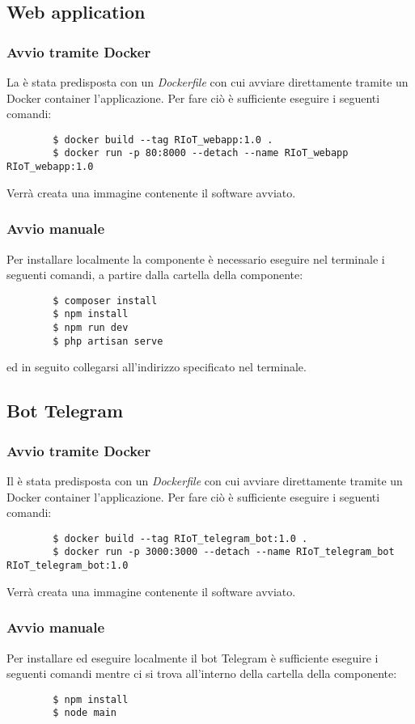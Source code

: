 	\subsection{Web application}

		\subsubsection{Avvio tramite Docker}
		La  è stata predisposta con un \textit{Dockerfile} con cui avviare direttamente tramite un Docker container l'applicazione. Per fare ciò è sufficiente eseguire i seguenti comandi:
		\begin{verbatim}
		$ docker build --tag RIoT_webapp:1.0 .
		$ docker run -p 80:8000 --detach --name RIoT_webapp RIoT_webapp:1.0
		\end{verbatim}
		Verrà creata una immagine contenente il software avviato.

		\subsubsection{Avvio manuale}
		Per installare localmente la componente  è necessario eseguire nel terminale i seguenti comandi, a partire dalla cartella della componente:
		\begin{verbatim}
		$ composer install
		$ npm install
		$ npm run dev
		$ php artisan serve
		\end{verbatim}
		ed in seguito collegarsi all'indirizzo specificato nel terminale.

	\subsection{Bot Telegram}

		\subsubsection{Avvio tramite Docker}
		Il  è stata predisposta con un \textit{Dockerfile} con cui avviare direttamente tramite un Docker container l'applicazione. Per fare ciò è sufficiente eseguire i seguenti comandi:
		\begin{verbatim}
		$ docker build --tag RIoT_telegram_bot:1.0 .
		$ docker run -p 3000:3000 --detach --name RIoT_telegram_bot RIoT_telegram_bot:1.0
		\end{verbatim}
		Verrà creata una immagine contenente il software avviato.

		\subsubsection{Avvio manuale}
		Per installare ed eseguire localmente il bot Telegram è sufficiente eseguire i seguenti comandi mentre ci si trova all'interno della cartella della componente:
		\begin{verbatim}
		$ npm install
		$ node main
		\end{verbatim}
		
